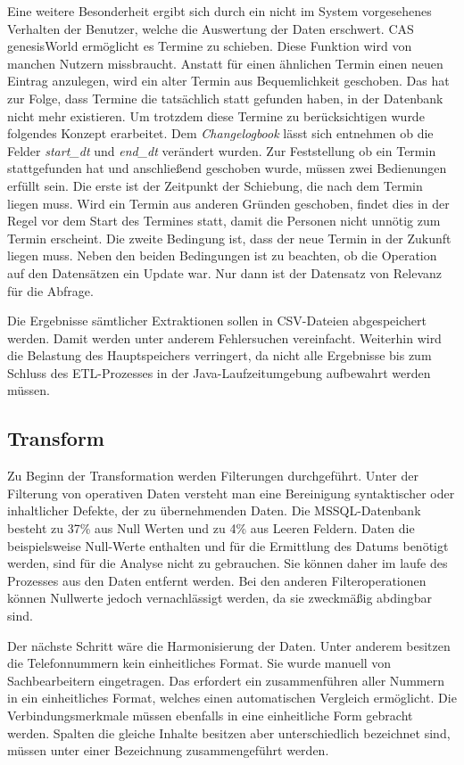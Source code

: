 Eine weitere Besonderheit ergibt sich durch ein nicht im System vorgesehenes Verhalten der Benutzer, welche die Auswertung der Daten erschwert. CAS genesisWorld ermöglicht es Termine zu schieben. Diese Funktion wird von manchen Nutzern missbraucht. Anstatt für einen ähnlichen Termin einen neuen Eintrag anzulegen, wird ein alter Termin aus Bequemlichkeit geschoben. Das hat zur Folge, dass Termine die tatsächlich statt gefunden haben, in der Datenbank nicht mehr existieren. Um trotzdem diese Termine zu berücksichtigen wurde folgendes Konzept erarbeitet. Dem \textit{Changelogbook} lässt sich entnehmen ob die Felder \textit{start\_dt} und \textit{end\_dt} verändert wurden. Zur Feststellung ob ein Termin stattgefunden hat und anschließend geschoben wurde, müssen zwei Bedienungen erfüllt sein. 
Die erste ist der Zeitpunkt der Schiebung, die nach dem Termin liegen muss. Wird ein Termin aus anderen Gründen geschoben, findet dies in der Regel vor dem Start des Termines statt, damit die Personen nicht unnötig zum Termin erscheint. Die zweite Bedingung ist, dass der neue Termin in der Zukunft liegen muss. Neben den beiden Bedingungen ist zu beachten, ob die Operation auf den Datensätzen ein Update war. Nur dann ist der Datensatz von Relevanz für die Abfrage. 

Die Ergebnisse sämtlicher Extraktionen sollen in CSV-Dateien abgespeichert werden. Damit werden unter anderem Fehlersuchen vereinfacht. Weiterhin wird die Belastung des Hauptspeichers verringert, da nicht alle Ergebnisse bis zum Schluss des ETL-Prozesses in der Java-Laufzeitumgebung aufbewahrt werden müssen.

\subsection{Transform}

Zu Beginn der Transformation werden Filterungen durchgeführt. Unter der Filterung von operativen Daten versteht man eine Bereinigung syntaktischer oder inhaltlicher Defekte, der zu übernehmenden Daten. Die MSSQL-Datenbank besteht zu 37\% aus Null Werten und zu 4\% aus Leeren Feldern. Daten die beispielsweise Null-Werte enthalten und für die Ermittlung des Datums benötigt werden, sind für die Analyse nicht zu gebrauchen. Sie können daher im laufe des Prozesses aus den Daten entfernt werden. Bei den anderen Filteroperationen können Nullwerte jedoch vernachlässigt werden, da sie zweckmäßig abdingbar sind.

Der nächste Schritt wäre die Harmonisierung der Daten. Unter anderem besitzen die Telefonnummern kein einheitliches Format. Sie wurde manuell von Sachbearbeitern eingetragen. Das erfordert ein zusammenführen aller Nummern in ein einheitliches Format, welches einen automatischen Vergleich ermöglicht. Die Verbindungsmerkmale müssen ebenfalls in eine einheitliche Form gebracht werden. Spalten die gleiche Inhalte besitzen aber unterschiedlich bezeichnet sind, müssen unter einer Bezeichnung zusammengeführt werden. 

